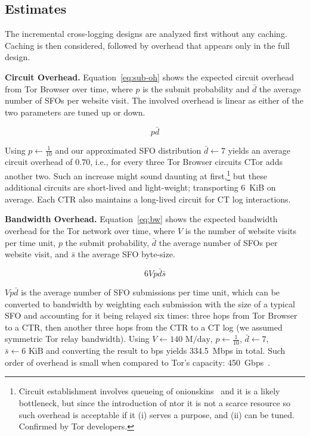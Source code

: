 \subsection{Estimates} \label{sec:performance:estimates}
The incremental cross-logging designs are analyzed first without any caching.
Caching is then considered, followed by overhead that appears only in the full
design.

\textbf{Circuit Overhead.}
Equation~\ref{eq:sub-oh} shows the expected circuit overhead from Tor Browser
over time, where $p$ is the submit probability and $\bar{d}$ the average number
of SFOs per website visit.  The involved overhead is linear as either of the two
parameters are tuned up or down.

\begin{equation} \label{eq:sub-oh}
	p\bar{d}
\end{equation}

Using $p\gets\frac{1}{10}$ and our approximated SFO distribution $\bar{d}\gets7$
yields an average circuit overhead of $0.70$, i.e., for every three Tor Browser
circuits CTor adds another two.  Such an increase might sound
daunting at first,\footnote{%
	Circuit establishment involves queueing of onionskins~\cite{onionskins} and
	it is a likely bottleneck, but since the introduction of ntor it is not a
	scarce resource so such overhead is acceptable if it (i) serves a purpose,
	and (ii) can be tuned.  Confirmed by Tor developers.
} but these additional circuits are short-lived and light-weight; transporting
6~KiB on average.  Each CTR also maintains a long-lived circuit for CT log
interactions.

\textbf{Bandwidth Overhead.}  Equation~\ref{eq:bw} shows the expected
bandwidth overhead for the Tor network over time, where
	$V$ is the number of website visits per time unit,
	$p$ the submit probability,
	$\bar{d}$ the average number of SFOs per website visit, and
	$\bar{s}$ the average SFO byte-size.

\begin{equation} \label{eq:bw}
	6Vp\bar{d}\bar{s}
\end{equation}

$Vp\bar{d}$ is the average number of SFO submissions per time unit, which can be
converted to bandwidth by weighting each submission with the size of
a typical SFO and accounting for it being relayed six times:
	three hops from Tor Browser to a CTR, then
	another three hops from the CTR to a CT log
	(we assumed symmetric Tor relay bandwidth).
Using
	$V\gets 140\textrm{~M/day}$,
	$p \gets \frac{1}{10}$,
	$\bar{d} \gets 7$,
	$\bar{s} \gets 6\textrm{~KiB}$
and converting the result to bps yields 334.5~Mbps in total.  Such order of
overhead is small when compared to Tor's capacity:
450~Gbps~\cite{tor-bandwidth}.

